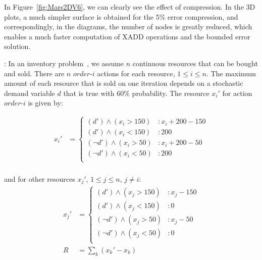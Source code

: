 In Figure~\ref{fig:Mars2DV6}, we can clearly see the effect of compression. In the 3D plots, a much simpler surface is obtained for the 5\% error compression, and correspondingly, in the diagrams, the number of nodes is greatly reduced, which enables a much faster computation of XADD operations and the bounded error solution. 

\Invent:
In an inventory problem~\cite{Scarf2002}, we assume $n$
continuous resources that can be bought and sold. There are $n$
$order$-$i$ actions for each resource, $ 1 \leq i \leq
n$. The maximum amount of each resource that is sold on one iteration
depends on a stochastic demand variable $d$ that is true with $60\%$
probability. The resource $x_i'$ for action $order$-$i$ is given by:

\vspace{-7mm}
{\footnotesize
\begin{align*}
x_i' & = \begin{cases} 
(d') \wedge (x_i > 150) &: x_i + 200 - 150\\
(d') \wedge (x_i < 150) &:  200\\
(\neg d') \wedge (x_i > 50) &: x_i + 200 - 50\\
(\neg d') \wedge (x_i < 50) &:  200\\
\end{cases} \\
\end{align*} }
\vspace{-13mm}

and for other resources $x_j'$, $1 \leq j \leq n$, $j\neq i$:\\

\vspace{-10mm}
{\footnotesize
\begin{align*}
x_j' & = \begin{cases} 
(d') \wedge (x_j > 150) &: x_j - 150\\
(d') \wedge (x_j < 150) &:  0\\
(\neg d') \wedge (x_j > 50) &: x_j - 50\\
(\neg d') \wedge (x_j < 50) &:  0\\
\end{cases} \\
R & = \sum_{k} {(x_k' - x_k)}\\
\end{align*} }
\vspace{-12mm}

